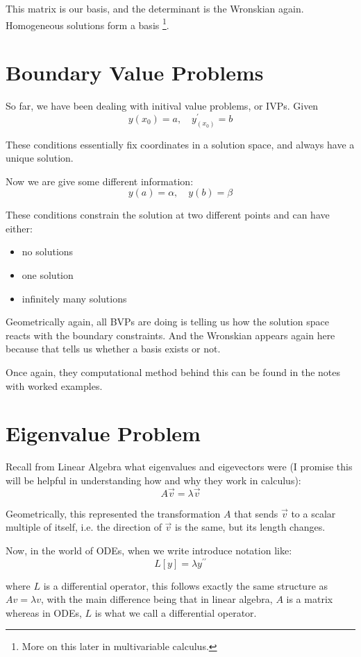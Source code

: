 This matrix is our basis, and the determinant is the Wronskian again. Homogeneous solutions form a basis \footnote{More on this later in multivariable calculus.  
}. 

\section{Boundary Value Problems}

So far, we have been dealing with initival value problems, or IVPs. Given
$$
y(x_0) = a, \quad y^{\prime}_(x_0) = b
$$

These conditions essentially fix coordinates in a solution space, and always have a unique solution. 

Now we are give some different information: 
$$
y(a) = \alpha, \quad y(b) = \beta
$$

These conditions constrain the solution at two different points and can have either: 
\begin{itemize}
    \item no solutions 
    \item one solution 
    \item infinitely many solutions 
\end{itemize}

Geometrically again, all BVPs are doing is telling us how the solution space reacts with the boundary constraints. And the Wronskian appears again here because that tells us whether a basis exists or not. 

Once again, they computational method behind this can be found in the notes with worked examples. 

\section{Eigenvalue Problem}

Recall from Linear Algebra what eigenvalues and eigevectors were (I promise this will be helpful in understanding how and why they work in calculus): 
$$
A\vec{v} = \lambda \vec{v}
$$

Geometrically, this represented the transformation $A$ that sends $\vec{v}$ to a scalar multiple of itself, i.e. the direction of $\vec{v}$ is the same, but its length changes. 

Now, in the world of ODEs, when we write introduce notation like: 
$$
L[y] = \lambda y^{\prime \prime}
$$

where $L$ is a differential operator, this follows exactly the same structure as $Av = \lambda v$, with the main difference being that in linear algebra, $A$ is a matrix whereas in ODEs, $L$ is what we call a differential operator. 

